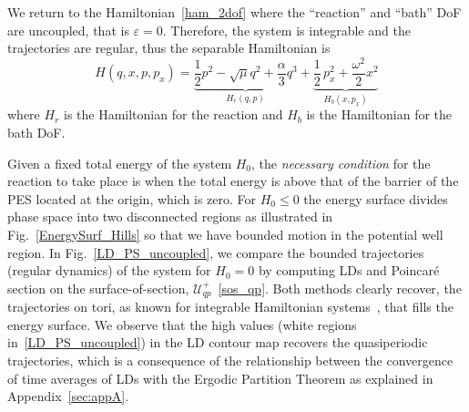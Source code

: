 \documentclass{ws-ijbc}
\begin{document}
We return to the Hamiltonian~\eqref{ham_2dof} where the ``reaction'' and ``bath'' DoF are uncoupled, that is $\varepsilon = 0$. Therefore, the system is integrable and the trajectories are regular, thus the separable Hamiltonian is
\begin{equation}
H(q,x,p,p_x) = \underbrace{\frac{1}{2} p^2 - \sqrt{\mu} q^2 + \frac{\alpha}{3} q^3}_{H_r(q,p)} + \underbrace{\frac{1}{2} \, p_x^2 + \frac{\omega^2}{2} x^2}_{H_b(x,p_x)}
\end{equation}
where $H_r$ is the Hamiltonian for the reaction and $H_b$ is the Hamiltonian for the bath DoF.

Given a fixed total energy of the system $H_0$, the \textit{necessary condition} for the reaction to take place is when the total energy is above that of the barrier of the PES located at the origin, which is zero. For $H_0 \leq 0$ the energy surface divides phase space into two disconnected regions as illustrated in Fig.~\ref{EnergySurf_Hills} so that we have bounded motion in the potential well region. In Fig.~\ref{LD_PS_uncoupled}, we compare the bounded trajectories (regular dynamics) of the system for $H_0 = 0$ by computing LDs and Poincar\'e section on the surface-of-section, $\mathcal{U}_{qp}^{+}$~\eqref{sos_qp}. Both methods clearly recover, the trajectories on tori, as known for integrable Hamiltonian systems~\cite{Meyer2009}, that fills the energy surface. We observe that the high values (white regions in~\ref{LD_PS_uncoupled}) in the LD contour map recovers the quasiperiodic trajectories, which is a consequence of the relationship between the convergence of time averages of LDs with the Ergodic Partition Theorem as explained in Appendix~\ref{sec:appA}. 
\end{document}
